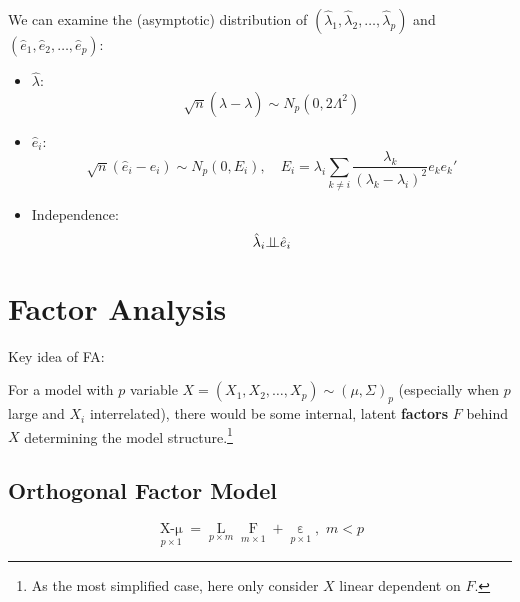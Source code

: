     We can examine the (asymptotic) distribution of $ (\hat{\lambda} _{1},\hat{\lambda} _{2},\ldots,\hat{\lambda} _{p})  $ and $ (\hat{e}_{1},\hat{e}_{2},\ldots,\hat{e}_{p})  $:
    \begin{itemize}[topsep=2pt,itemsep=2pt]
        \item $ \hat{\lambda } $:
        \begin{equation}
            \sqrt{n}(\hat{\lambda }-\lambda )\sim N_p(0,2\Lambda ^2) 
        \end{equation}
        \item $ \hat{e}_i $:
        \begin{equation}
            \sqrt{n}(\hat{e}_i-e_i)\sim N_p(0,E_i),\quad E_i=\lambda _i\sum_{k\neq i}\dfrac{\lambda _k}{(\lambda _k-\lambda _i)^2}e_ke_k' 
        \end{equation}
        \item Independence:
        \begin{equation}
            \hat{\lambda }_i\bot\!\!\!\bot \hat{e}_i 
        \end{equation}
        
    \end{itemize}
    
        










\section{Factor Analysis}
    \hypertarget{SubSectionFA}{Key idea of FA:} For a model with $ p $ variable $ X=(X_{1},X_{2},\ldots,X_{p})\sim (\mu ,\Sigma )_p  $ (especially when $ p $ large and $ X_i $ interrelated), there would be some internal, latent \textbf{factors} $ F $ behind $ X $ determining the model structure.\footnote{As the most simplified case, here only consider $ X $ linear dependent on $ F $.}


\subsection{Orthogonal Factor Model}
    
    \begin{equation}
        \mathop{X-\mu}\limits_{p\times 1}=\mathop{L}\limits_{p\times m}\mathop{F}\limits_{m\times 1} +\mathop{\varepsilon }\limits_{p\times 1} ,\,\, m<p 
    \end{equation}
    
